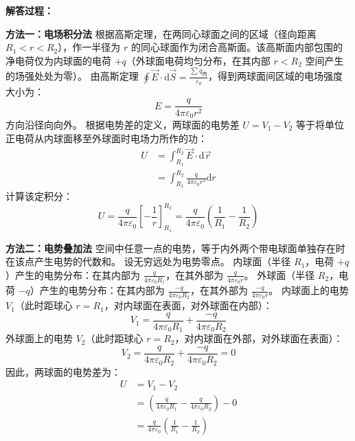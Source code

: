 \begin{enumerate}
	\textbf{解答过程： }
	
	\textbf{方法一：电场积分法}
	根据高斯定理，在两同心球面之间的区域（径向距离 $R_1 < r < R_2$），作一半径为 $r$ 的同心球面作为闭合高斯面。该高斯面内部包围的净电荷仅为内球面的电荷 $+q$（外球面电荷均匀分布，在其内部 $r < R_2$ 空间产生的场强处处为零）。
	由高斯定理 $\oint \vec{E} \cdot \mathrm{d}\vec{S} = \frac{\sum q_{\text{内}}}{\varepsilon_0}$，得到两球面间区域的电场强度大小为：
	\begin{equation}\label{eq:L7-12-1}
		E = \frac{q}{4\pi\varepsilon_0 r^2}
	\end{equation}
	方向沿径向向外。
	根据电势差的定义，两球面的电势差 $U = V_1 - V_2$ 等于将单位正电荷从内球面移至外球面时电场力所作的功：
	\begin{align*}
		U &= \int_{R_1}^{R_2} \vec{E} \cdot \mathrm{d}\vec{r} \\
		&= \int_{R_1}^{R_2} \frac{q}{4\pi\varepsilon_0 r^2} \mathrm{d}r
	\end{align*}
	计算该定积分：
	\begin{equation}\label{eq:L7-12-2}
		U = \frac{q}{4\pi\varepsilon_0} \left[ -\frac{1}{r} \right]_{R_1}^{R_2} = \frac{q}{4\pi\varepsilon_0} \left( \frac{1}{R_1} - \frac{1}{R_2} \right)
	\end{equation}
	
	\textbf{方法二：电势叠加法}
	空间中任意一点的电势，等于内外两个带电球面单独存在时在该点产生电势的代数和。
	设无穷远处为电势零点。
	内球面（半径 $R_1$，电荷 $+q$）产生的电势分布：在其内部为 $\frac{q}{4\pi\varepsilon_0 R_1}$，在其外部为 $\frac{q}{4\pi\varepsilon_0 r}$。
	外球面（半径 $R_2$，电荷 $-q$）产生的电势分布：在其内部为 $\frac{-q}{4\pi\varepsilon_0 R_2}$，在其外部为 $\frac{-q}{4\pi\varepsilon_0 r}$。
	内球面上的电势 $V_1$（此时距球心 $r = R_1$，对内球面在表面，对外球面在内部）：
	\begin{equation}\label{eq:L7-12-3}
		V_1 = \frac{q}{4\pi\varepsilon_0 R_1} + \frac{-q}{4\pi\varepsilon_0 R_2}
	\end{equation}
	外球面上的电势 $V_2$（此时距球心 $r = R_2$，对内球面在外部，对外球面在表面）：
	\begin{equation}\label{eq:L7-12-4}
		V_2 = \frac{q}{4\pi\varepsilon_0 R_2} + \frac{-q}{4\pi\varepsilon_0 R_2} = 0
	\end{equation}
	因此，两球面的电势差为：
	\begin{align*}
		U &= V_1 - V_2 \\
		&= \left( \frac{q}{4\pi\varepsilon_0 R_1} - \frac{q}{4\pi\varepsilon_0 R_2} \right) - 0 \\
		&= \frac{q}{4\pi\varepsilon_0} \left( \frac{1}{R_1} - \frac{1}{R_2} \right)
	\end{align*}
	

\end{enumerate}
